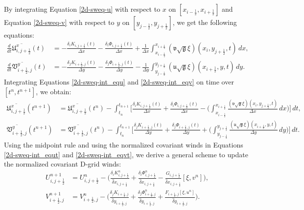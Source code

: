 By integrating Equation \eqref{2d-sweq-u} with respect to $x$ on $[x_{i-\frac{1}{2}},x_{i+\frac{1}{2}}]$ and Equation \eqref{2d-sweq-v} with respect to $y$ on $[y_{j-\frac{1}{2}},y_{j+\frac{1}{2}}]$, we get the following equations:
\begin{align}
	\label{2d-sweq-int_equ}
	\frac{d}{dt}\overline{\mathfrak{U}^x_{i,j+\frac{1}{2}}}
	(t)&= -\frac{\delta_i K_{i,j+\frac{1}{2}}(t)}{\Delta x}-\frac{\delta_i \Phi_{i,j+\frac{1}{2}}(t)}{\Delta x} + 
	\frac{1}{\Delta x}
	\int_{x_{i-\frac{1}{2}}}^{x_{i+\frac{1}{2}}}
	(\mathfrak{v}\sqrt{\mathfrak{g}}\xi)(x_i, y_{j+\frac{1}{2}}, t) \,dx, \\
	\label{2d-sweq-int_eqv}
	\frac{d}{dt} \overline{\mathfrak{V}^y_{i+\frac{1}{2},j}}(t)&= -\frac{\delta_j K_{i+\frac{1}{2},j}(t)}{\Delta y}-
	\frac{\delta_j \Phi_{i+\frac{1}{2},j}(t)}{\Delta y}
	- \frac{1}{\Delta y}
	\int_{y_{j-\frac{1}{2}}}^{y_{j+\frac{1}{2}}} 
	(\mathfrak{u}\sqrt{\mathfrak{g}}\xi)(x_{i+\frac{1}{2}}, y, t) \,dy.
\end{align}
Integrating Equations \eqref{2d-sweq-int_equ} and \eqref{2d-sweq-int_eqv} on time over $[t^n,t^{n+1}]$, we obtain:
\begin{align}
	\label{2d-sweq-int_equt}
	\overline{\mathfrak{U}^x_{i,j+\frac{1}{2}}}(t^{n+1})&=
	\overline{\mathfrak{U}^x_{i,j+\frac{1}{2}}}(t^{n}) -
	\int_{t_{n}}^{t_{n+1}}\bigg[
	\frac{\delta_i K_{i,j+\frac{1}{2}}(t)}{\Delta x}
	+\frac{\delta_i \Phi_{i,j+\frac{1}{2}}(t)}{\Delta x} - \bigg(
	\int_{x_{i-\frac{1}{2}}}^{x_{i+\frac{1}{2}}}
	\frac{(\mathfrak{v}\sqrt{\mathfrak{g}}\xi)(x_i, y_{j+\frac{1}{2}}, t)}{\Delta x}
	\,dx \bigg)\bigg]
	\,dt ,\\
	\label{2d-sweq-int_eqvt}
	\overline{\mathfrak{V}^y_{i+\frac{1}{2},j}}(t^{n+1})&=
	\overline{\mathfrak{V}^y_{i+\frac{1}{2},j}}(t^{n}) -
	\int_{t_{n}}^{t_{n+1}}\bigg[
	\frac{\delta_j K_{i+\frac{1}{2},j}(t)}{\Delta y}+\frac{\delta_j\Phi_{i+\frac{1}{2},j}(t)}{\Delta y}+ \bigg(
	\int_{y_{j-\frac{1}{2}}}^{y_{j+\frac{1}{2}}} 
	\frac{(\mathfrak{u}\sqrt{\mathfrak{g}}\xi)(x_{i+\frac{1}{2}}, y, t)}{\Delta y}
	\,dy \bigg)\bigg]\,dt .
\end{align}
Using the midpoint rule and using the normalized covariant winds in Equations \eqref{2d-sweq-int_equt} and \eqref{2d-sweq-int_eqvt}, we derive a general scheme
to update the normalized covariant D-grid winds:
\begin{align}
	\label{2d-sweq-dscheme-u}
	{U}_{i,j+\frac{1}{2}}^{n+1}&=
	{U}_{i,j+\frac{1}{2}}^{n} - \bigg(
	\frac{\delta_i K_{i,j+\frac{1}{2}}^n}{\hat{\delta} x_{i,j+\frac{1}{2}}}
	+\frac{\delta_i \Phi_{i,j+\frac{1}{2}}^n}{\hat{\delta} x_{i,j+\frac{1}{2}}}
	- \frac{G_{i,j+\frac{1}{2}}}{{\hat{\delta} x_{i,j+\frac{1}{2}}}}[\xi, v^n]\bigg)
	,\\
	\label{2d-sweq-dscheme-v}
	{V}_{i+\frac{1}{2},j}^{n+1}&=
	{V}_{i+\frac{1}{2},j}^{n} - \bigg(
	\frac{\delta_j K_{i+\frac{1}{2},j}}{\hat{\delta} y_{i+\frac{1}{2},j}}+
	\frac{\delta_j \Phi_{{i+\frac{1}{2}},j}^n}{\hat{\delta} y_{i+\frac{1}{2},j}}
	+ \frac{F_{i+\frac{1}{2},j}[\xi, u^n]}{\hat{\delta} y_{i+\frac{1}{2},j}} \bigg).
\end{align}
